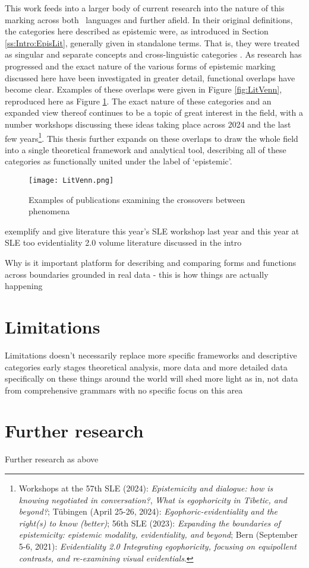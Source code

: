 This work feeds into a larger body of current research into the nature of this marking across both \lfam\ languages and further afield. In their original definitions, the categories here described as epistemic were, as introduced in Section \ref{ss:Intro:EpisLit}, generally given in standalone terms. That is, they were treated as singular and separate concepts and cross-linguistic categories \cites{ChafeNichols1986}{DeLanceyMirativity1997}{Tournadre1992}{EvansBergqvistSanRoque2018a}. As research has progressed and the exact nature of the various forms of epistemic marking discussed here have been investigated in greater detail, functional overlaps have become clear. Examples of these overlaps were given in Figure \ref{fig:LitVenn}, reproduced here as Figure \ref{f:Conclusion:LitVenn}. The exact nature of these categories and an expanded view thereof continues to be a topic of great interest in the field, with a number workshops discussing these ideas taking place across 2024 and the last few years\footnote{Workshops at the 57th SLE (2024): \textit{Epistemicity and dialogue: how is knowing negotiated in conversation?}, \textit{What is egophoricity in Tibetic, and beyond?}; Tübingen (April 25-26, 2024): \textit{Egophoric-evidentiality and the right(s) to know (better)}; 56th SLE (2023): \textit{Expanding the boundaries of epistemicity: epistemic modality, evidentiality, and beyond}; Bern (September 5-6, 2021): \textit{Evidentiality 2.0 Integrating egophoricity, focusing on equipollent contrasts, and re-examining visual evidentials}.}. This thesis further expands on these overlaps to draw the whole field into a single theoretical framework and analytical tool, describing all of these categories as functionally united under the label of `epistemic'.

\begin{figure}
    \centering
    \texttt{[image: LitVenn.png]}
    \caption{Examples of publications examining the crossovers between phenomena}
    \label{f:Conclusion:LitVenn}
\end{figure}


exemplify and give literature
this year's SLE workshop
last year and this year at SLE too
evidentiality 2.0 volume
literature discussed in the intro

Why is it important 
platform for describing and comparing forms and functions across boundaries
grounded in real data - this is how things are actually happening

\section{Limitations}
Limitations
doesn't necessarily replace more specific frameworks and descriptive categories
early stages theoretical analysis, more data and more detailed data specifically on these things around the world will shed more light
    as in, not data from comprehensive grammars with no specific focus on this area

\section{Further research}
Further research
as above